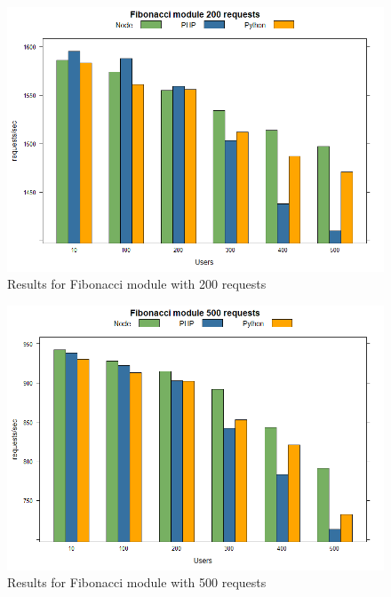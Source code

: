 \documentclass[../thesis.tex]{subfiles}
\begin{document}
\begin{figure}[H]
	\centering
	\includegraphics[width=1\textwidth]{../images/200requestsFibo.png}
	\caption{Results for Fibonacci module with 200 requests}
	\label{rys1}
\end{figure}\begin{figure}[H]
\centering
\includegraphics[width=1\textwidth]{../images/500requestsFibo.png}
\caption{Results for Fibonacci module with 500 requests}
\label{rys1}
\end{figure}
\end{document}
